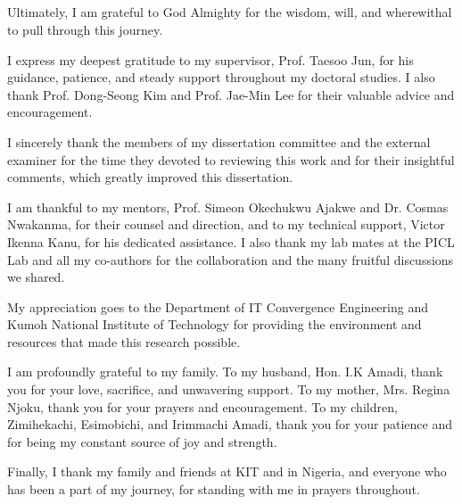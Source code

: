 \begin{titlepage}
\section*{\Huge{}}
\vspace{0.5cm}
\large

Ultimately, I am grateful to God Almighty for the wisdom, will, and wherewithal to pull through this journey.

I express my deepest gratitude to my supervisor, Prof. Taesoo Jun, for his guidance, patience, and steady support throughout my doctoral studies. I also thank Prof. Dong-Seong Kim and Prof. Jae-Min Lee for their valuable advice and encouragement.

I sincerely thank the members of my dissertation committee and the external examiner for the time they devoted to reviewing this work and for their insightful comments, which greatly improved this dissertation.

I am thankful to my mentors, Prof. Simeon Okechukwu Ajakwe and Dr. Cosmas Nwakanma, for their counsel and direction, and to my technical support, Victor Ikenna Kanu, for his dedicated assistance. I also thank my lab mates at the PICL Lab and all my co-authors for the collaboration and the many fruitful discussions we shared.

My appreciation goes to the Department of IT Convergence Engineering and Kumoh National Institute of Technology for providing the environment and resources that made this research possible.

I am profoundly grateful to my family. To my husband, Hon. I.K Amadi, thank you for your love, sacrifice, and unwavering support. To my mother, Mrs. Regina Njoku, thank you for your prayers and encouragement. To my children, Zimihekachi, Esimobichi, and Irimmachi Amadi, thank you for your patience and for being my constant source of joy and strength.

Finally, I thank my family and friends at KIT and in Nigeria, and everyone who has been a part of my journey, for standing with me in prayers throughout.

\end{titlepage}
